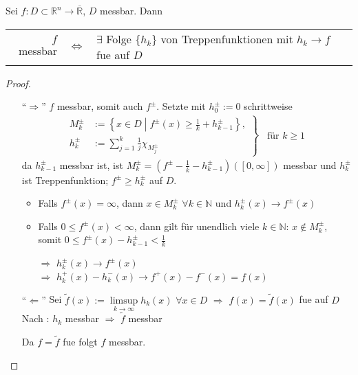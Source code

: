 \begin{proposition}
	Sei $f:D\subset\mathbb{R}^n\to\overline{\mathbb{R}}$, $D$ messbar. Dann
	\begin{center}
	\begin{tabularx}{\linewidth}{r@{\ \ }c@{\ \ }X}
		\hspace*{0.19\linewidth} $f$ messbar & $\Leftrightarrow$ & $\exists$ Folge $\{ h_k\}$ von Treppenfunktionen mit $h_k\to f$ \gls{fue} auf $D$
	\end{tabularx}
	\end{center}
\end{proposition}
\begin{proof}\hspace*{0pt}
	\begin{itemize}[topsep=\dimexpr-\baselineskip/2\relax]
		\item["`$\Rightarrow$"'] $f$ messbar, somit auch $f^{\pm}$. Setzte mit $h_0^{\pm} := 0$ schrittweise \begin{align*}
			\left.\begin{aligned}
			M_k^{\pm} &:= \left\{ x\in D \;\left|\; f^{\pm}(x) \ge \frac{1}{k} + h_{k-1}^\pm \right.\right\}, \\
			h_k^{\pm} &:= \sum_{j=1}^k \frac{1}{j}\chi_{M_j^{\pm}}
			\end{aligned}\right\}\begin{gathered}
				\;\,\text{für $k\ge 1$}
			\end{gathered}
		\end{align*}
		da $h_{k-1}^\pm$ messbar ist, ist $M_k^{\pm} = \left( f^{\pm} - \frac{1}{k} - h_{k-1}^\pm\right)([0,\infty])$ messbar und 
		$h_k^{\pm}$ ist Treppenfunktion; $f^{\pm}\ge h_k^{\pm}$ auf $D$.
		
		\begin{itemize}
		\item Falls $f^\pm(x) = \infty$, dann $x\in M_k^\pm$ $\forall k\in\mathbb{N}$ und $h_k^\pm(x)\to f^{\pm}(x)$
		
		\item Falls $0\le f^{\pm}(x) < \infty$, dann gilt für unendlich viele $k\in\mathbb{N}$: $x\notin M_k^\pm$, somit $0\le f^{\pm}(x) - h_{k-1}^\pm < \frac{1}{k}$
		
		$\Rightarrow$ $h_k^\pm(x) \to f^{\pm}(x)$\\
		$\Rightarrow$ $h_k^+(x) - h_k^-(x) \to f^+(x) - f^-(x) = f(x)$
		\end{itemize}
		
		\item["`$\Leftarrow$"']
		Sei $\tilde{f}(x) := \limsup\limits_{k\to\infty} h_k(x)$ $\forall x\in D$ $\Rightarrow$ $f(x) = \tilde{f}(x)$ \gls{fue} auf $D$ \\
		Nach : $h_k$ messbar $\Rightarrow$ $\tilde{f}$ messbar
		
		Da $f=\tilde{f}$ \gls{fue} folgt $f$ messbar.
	\end{itemize}
\end{proof}

